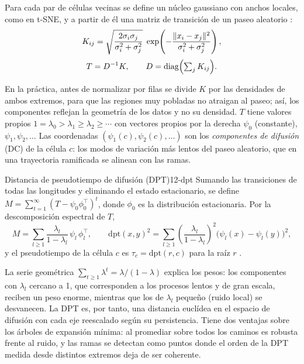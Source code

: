 Para cada par de células vecinas se define un núcleo gaussiano con anchos locales, como en t-SNE, y a partir de él una matriz de transición de un paseo aleatorio \parencite{c12-haghverdi2016}:
\begin{equation}\label{eq:12-kernel}
\begin{gathered}
K_{ij}=\sqrt{\frac{2\sigma_i\sigma_j}{\sigma_i^2+\sigma_j^2}}\;\exp\!\left(-\frac{\lVert x_i-x_j\rVert^2}{\sigma_i^2+\sigma_j^2}\right),\\[2pt]
T=D^{-1}K,\qquad D=\operatorname{diag}\Bigl(\textstyle\sum_j K_{ij}\Bigr).
\end{gathered}
\end{equation}
\begin{simbolos}
\end{simbolos}
En la práctica, antes de normalizar por filas se divide $K$ por las densidades de ambos extremos, para que las regiones muy pobladas no atraigan al paseo; así, los componentes reflejan la geometría de los datos y no su densidad. $T$ tiene valores propios $1=\lambda_0>\lambda_1\ge\lambda_2\ge\cdots$ con vectores propios por la derecha $\psi_0$ (constante), $\psi_1,\psi_2,\dots$ Las coordenadas $(\psi_1(c),\psi_2(c),\dots)$ son los \emph{componentes de difusión} (DC) de la célula $c$: los modos de variación más lentos del paseo aleatorio, que en una trayectoria ramificada se alinean con las ramas.

\begin{teorema}{Distancia de pseudotiempo de difusión (DPT)}{12-dpt}
Sumando las transiciones de todas las longitudes y eliminando el estado estacionario, se define $M=\sum_{t=1}^{\infty}\left(T-\psi_0\phi_0^{\top}\right)^{t}$, donde $\phi_0$ es la distribución estacionaria. Por la descomposición espectral de $T$,
\begin{equation}\label{eq:12-dpt}
M=\sum_{l\ge1}\frac{\lambda_l}{1-\lambda_l}\,\psi_l\,\phi_l^{\top},\qquad
\mathrm{dpt}(x,y)^2=\sum_{l\ge1}\left(\frac{\lambda_l}{1-\lambda_l}\right)^{2}\bigl(\psi_l(x)-\psi_l(y)\bigr)^2,
\end{equation}
y el pseudotiempo de la célula $c$ es $\tau_c=\mathrm{dpt}(r,c)$ para la raíz $r$ \parencite{c12-haghverdi2016}.
\end{teorema}
La serie geométrica $\sum_{t\ge1}\lambda^t=\lambda/(1-\lambda)$ explica los pesos: los componentes con $\lambda_l$ cercano a 1, que corresponden a los procesos lentos y de gran escala, reciben un peso enorme, mientras que los de $\lambda_l$ pequeño (ruido local) se desvanecen. La DPT es, por tanto, una distancia euclídea en el espacio de difusión con cada eje reescalado según su persistencia. Tiene dos ventajas sobre los árboles de expansión mínima: al promediar sobre todos los caminos es robusta frente al ruido, y las ramas se detectan como puntos donde el orden de la DPT medida desde distintos extremos deja de ser coherente.


